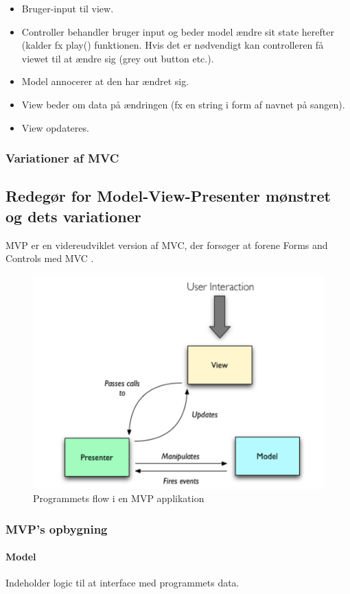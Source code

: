 \begin{itemize}
	\item Bruger-input til view.
	\item Controller behandler bruger input og beder model ændre sit state herefter (kalder fx play() funktionen. Hvis det er nødvendigt kan controlleren få viewet til at ændre sig (grey out button etc.).
	\item Model annocerer at den har ændret sig.
	\item View beder om data på ændringen (fx en string i form af navnet på sangen).
	\item View opdateres.
\end{itemize}

\subsubsection{Variationer af MVC}

\subsection{Redegør for Model-View-Presenter mønstret og dets variationer}
MVP er en videreudviklet version af MVC, der forsøger at forene Forms and Controls med MVC .

\begin{figure}[h]
	\centering
	\includegraphics[width=0.7\linewidth]{figs/mvpFlow}
	\caption{Programmets flow i en MVP applikation}
	\label{fig:mvpFlow}
\end{figure}

\subsubsection{MVP's opbygning}
\paragraph{Model} Indeholder logic til at interface med programmets data.
